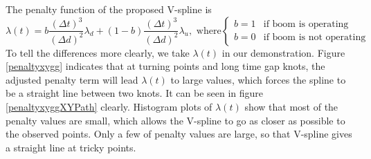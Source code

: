 The penalty function of the proposed V-spline is
\begin{equation}\label{penaltylamb}
\lambda(t)=b\frac{\left(\Delta t\right)^3}{\left(\Delta d\right)^2}\lambda_d+(1-b)\frac{\left(\Delta t\right)^3}{\left(\Delta d\right)^2}\lambda_u, \mbox{ where}
\begin{cases}
b=1 & \mbox{if boom is operating}\\
b=0 & \mbox{if boom is not operating}
\end{cases}
\end{equation}
To tell the differences more clearly, we take $\lambda(t)$ in our demonstration. Figure \ref{penaltyxygg} indicates that at turning points and long time gap knots, the adjusted penalty term will lead $\lambda(t)$ to large values, which forces the spline to be a straight line between two knots. It can be seen in figure \ref{penaltyxyggXYPath} clearly. Histogram plots of $\lambda(t)$ show that most of the penalty values are small, which allows the V-spline to go as closer as possible to the observed points. Only a few of penalty values are large, so that V-spline gives a straight line at tricky points. 


